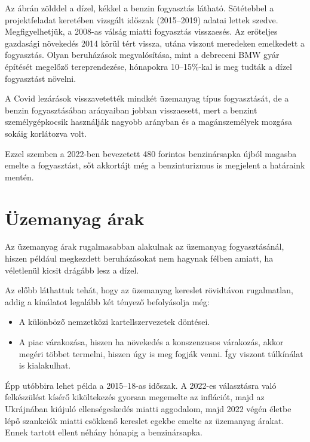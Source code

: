 Az ábrán zölddel a dízel, kékkel a benzin fogyasztás látható. Sötétebbel a projektfeladat keretében
vizsgált időszak (2015--2019) adatai lettek szedve. Megfigyelhetjük, a 2008-as válság miatti
fogyasztás visszaesés. Az erőteljes gazdasági növekedés 2014 körül tért vissza, utána viszont
meredeken emelkedett a fogyasztás. Olyan beruházások megvalósítása, mint a debreceni BMW gyár
építését megelőző tereprendezése, hónapokra 10--15\%-kal is meg tudták a dízel fogyasztást növelni.

A Covid lezárások visszavetették mindkét üzemanyag típus fogyasztását, de a benzin fogyasztásában
arányaiban jobban visszaesett, mert a benzint személygépkocsik használják nagyobb arányban és a
magánszemélyek mozgása sokáig korlátozva volt.

Ezzel szemben a 2022-ben bevezetett 480 forintos benzinársapka újból magasba emelte a fogyasztást,
sőt akkortájt még a benzinturizmus is megjelent a határaink mentén.

\section{Üzemanyag árak}

Az üzemanyag árak rugalmasabban alakulnak az üzemanyag fogyasztásánál, hiszen például megkezdett
beruházásokat nem hagynak félben amiatt, ha véletlenül kicsit drágább lesz a dízel.

Az előbb láthattuk tehát, hogy az üzemanyag kereslet rövidtávon rugalmatlan, addig a kínálatot
legalább két tényező befolyásolja még:
\begin{itemize}
    \item A különböző nemzetközi kartellszervezetek döntései.
    \item A piac várakozása, hiszen ha növekedés a konszenzusos várakozás, akkor megéri többet termelni,
          hiszen úgy is meg fogják venni. Így viszont túlkínálat is kialakulhat.
\end{itemize}

Épp utóbbira lehet példa a 2015--18-as időszak. A 2022-es választásra való felkészülést kísérő
kiköltekezés gyorsan megemelte az inflációt, majd az Ukrájnában kiújuló ellenségeskedés miatti aggodalom,
majd 2022 végén életbe lépő szankciók miatti csökkenő kereslet egekbe emelte az üzemanyag árakat. Ennek tartott ellent néhány hónapig a benzinársapka.

